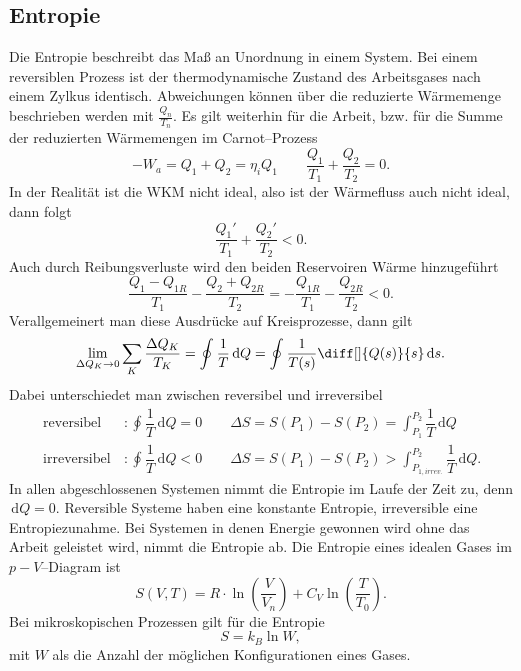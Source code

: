 \documentclass[a4paper,12pt]{article}
\newcommand{\td}{\,\text{d}}
\begin{document}
\subsection{Entropie}
Die Entropie beschreibt das Maß an Unordnung in einem System. Bei einem reversiblen Prozess ist der thermodynamische Zustand des Arbeitsgases nach einem Zylkus identisch. Abweichungen können über die reduzierte Wärmemenge beschrieben werden mit $\tfrac{Q_n}{T_n}$. Es gilt weiterhin für die Arbeit, bzw. für die Summe der reduzierten Wärmemengen im Carnot--Prozess
\[ 
        -W_a=Q_1+Q_2=\eta _iQ_1\qquad \dfrac{Q_1}{T_1}+\dfrac{Q_2}{T_2}=0
.\] 
In der Realität ist die WKM nicht ideal, also ist der Wärmefluss auch nicht ideal, dann folgt
\[ 
        \dfrac{Q_1'}{T_1}+\dfrac{Q_2'}{T_2}<0
.\] 
Auch durch Reibungsverluste wird den beiden Reservoiren Wärme hinzugeführt
\[ 
        \dfrac{Q_1-Q_{1R}}{T_1}-\dfrac{Q_2+Q_{2R}}{T_2}=-\dfrac{Q_{1R}}{T_1}-\dfrac{Q_{2R}}{T_2}<0
.\] 
Verallgemeinert man diese Ausdrücke auf Kreisprozesse, dann gilt
\[ 
        \lim_{\Delta Q_K\rightarrow 0}\sum_{K}^{}\dfrac{\Delta Q_K}{T_K}=\oint_{}^{}\dfrac{1}{T}\td Q=\oint_{}^{}\dfrac{1}{T(s)}\diff[]{Q(s)}{s}\td s
.\] 
Dabei unterschiedet man zwischen reversibel und irreversibel
\begin{align*}
        \,\text{reversibel}\,&:\oint_{}^{}\dfrac{1}{T}\td Q=0\qquad \Delta S=S(P_1)-S(P_2)=\int_{P_1}^{P_2}\dfrac{1}{T}\td Q\\
        \,\text{irreversibel}\,&:\oint_{}^{}\dfrac{1}{T}\td Q<0\qquad \Delta S=S(P_1)-S(P_2)>\int_{P_{1,irrev.}}^{P_2}\dfrac{1}{T}\td Q
.\end{align*}
In allen abgeschlossenen Systemen nimmt die Entropie im Laufe der Zeit zu, denn $\td Q=0$. Reversible Systeme haben eine konstante Entropie, irreversible eine Entropiezunahme. Bei Systemen in denen Energie gewonnen wird ohne das Arbeit geleistet wird, nimmt die Entropie ab. Die Entropie eines idealen Gases im $p-V$--Diagram ist
\[ 
        S(V,T)=R\cdot \ln\left(\dfrac{V}{V_n}\right)+C_V\ln\left(\dfrac{T}{T_0}\right)
.\] 
Bei mikroskopischen Prozessen gilt für die Entropie
\[ 
        S=k_B\ln W
,\] 
mit $W$ als die Anzahl der möglichen Konfigurationen eines Gases.

\newpage
\end{document}
